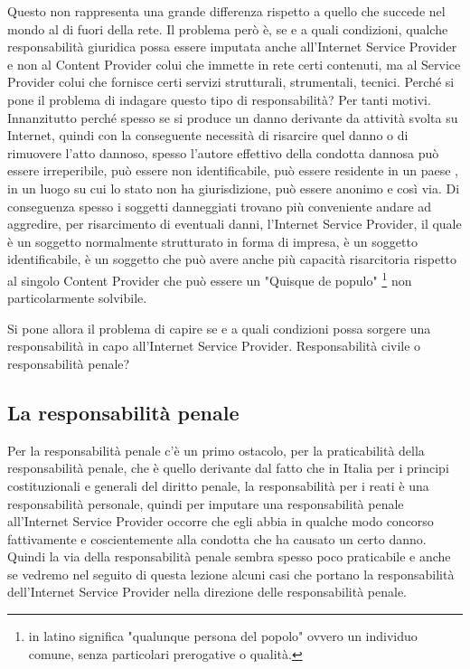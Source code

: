 Questo non rappresenta una grande differenza rispetto a quello che succede nel mondo al di fuori della rete. Il problema però è, se e a quali condizioni, qualche responsabilità giuridica possa essere imputata anche all'Internet Service Provider e non al Content Provider colui che immette in rete certi contenuti, ma al Service Provider colui che fornisce certi servizi strutturali, strumentali, tecnici. Perché si pone il problema di indagare questo tipo di responsabilità? Per tanti motivi. Innanzitutto perché spesso se si produce un danno derivante da attività svolta su Internet, quindi con la conseguente necessità di risarcire quel danno o di rimuovere l'atto dannoso, spesso l'autore effettivo della condotta dannosa può essere irreperibile, può essere non identificabile, può essere residente in un paese , in un luogo su cui lo stato non ha giurisdizione, può essere anonimo e così via. Di conseguenza spesso i soggetti danneggiati trovano più conveniente andare ad aggredire, per risarcimento di eventuali danni, l'Internet Service Provider, il quale è un soggetto normalmente strutturato in forma di impresa, è un soggetto identificabile, è un soggetto che può avere anche più capacità risarcitoria rispetto al singolo Content Provider che può essere un "Quisque de populo" \footnote{in latino significa "qualunque persona del popolo" ovvero un individuo comune, senza particolari prerogative o qualità.} non particolarmente solvibile. 

Si pone allora il problema di capire se e a quali condizioni possa sorgere una responsabilità in capo all'Internet Service Provider. Responsabilità civile o responsabilità penale? 

\subsection{La responsabilità penale}
Per la responsabilità penale c'è un primo ostacolo, per la praticabilità della responsabilità penale, che è quello derivante dal fatto che in Italia per i principi costituzionali e generali del diritto penale, la responsabilità per i reati è una responsabilità personale, quindi per imputare una responsabilità penale all'Internet Service Provider occorre che egli abbia in qualche modo concorso fattivamente e coscientemente alla condotta che ha causato un certo danno. 
Quindi la via della responsabilità penale sembra spesso poco praticabile e anche se vedremo nel seguito di questa lezione alcuni casi che portano la responsabilità dell'Internet Service Provider nella direzione delle responsabilità penale. 

